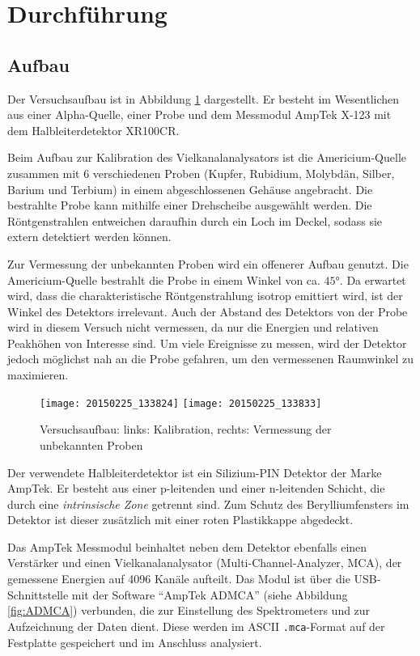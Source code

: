 \documentclass{../Misc/MontavonLaTeX/Montavon}
\newcommand{\halfwidth}{0.48\textwidth}
\begin{document}
\section{Durchführung}
\subsection{Aufbau}
Der Versuchsaufbau ist in Abbildung \ref{fig:Aufbau} dargestellt. 
Er besteht im Wesentlichen aus einer  Alpha-Quelle, einer Probe und dem Messmodul AmpTek X-123 mit dem Halbleiterdetektor XR100CR\cite{anleitung}.

Beim Aufbau zur Kalibration des Vielkanalanalysators ist die Americium-Quelle zusammen mit 6 verschiedenen Proben (Kupfer, Rubidium, Molybdän, Silber, Barium und Terbium) in einem abgeschlossenen Gehäuse angebracht. Die bestrahlte Probe kann mithilfe einer Drehscheibe ausgewählt werden. Die Röntgenstrahlen entweichen daraufhin durch ein Loch im Deckel, sodass sie extern detektiert werden können.

Zur Vermessung der unbekannten Proben wird ein offenerer Aufbau genutzt. Die Americium-Quelle bestrahlt die Probe in einem Winkel von ca. $45 \unit{\degree}$. Da erwartet wird, dass die charakteristische Röntgenstrahlung isotrop emittiert wird, ist der Winkel des Detektors irrelevant. Auch der Abstand des Detektors von der Probe wird in diesem Versuch nicht vermessen, da nur die Energien und relativen Peakhöhen von Interesse sind. Um viele Ereignisse zu messen, wird der Detektor jedoch möglichst nah an die Probe gefahren, um den vermessenen Raumwinkel zu maximieren.

\begin{figure}[htbp]
\centering
\texttt{[image: 20150225\_133824]}
\texttt{[image: 20150225\_133833]}
\caption{Versuchsaufbau: links: Kalibration, rechts: Vermessung der unbekannten Proben}
\label{fig:Aufbau}
\end{figure}

Der verwendete Halbleiterdetektor ist ein Silizium-PIN Detektor der Marke AmpTek. Er besteht aus einer p-leitenden und einer n-leitenden Schicht, die durch eine \emph{intrinsische Zone} getrennt sind\cite{anleitung}. Zum Schutz des Berylliumfensters im Detektor ist dieser zusätzlich mit einer roten Plastikkappe abgedeckt. 

Das AmpTek Messmodul beinhaltet neben dem Detektor ebenfalls einen Verstärker und einen Vielkanalanalysator (Multi-Channel-Analyzer, MCA), der gemessene Energien auf 4096 Kanäle aufteilt. Das Modul ist über die USB-Schnittstelle mit der Software \enquote{AmpTek ADMCA} (siehe Abbildung \ref{fig:ADMCA}) verbunden, die zur Einstellung des Spektrometers und zur Aufzeichnung der Daten dient. Diese werden im ASCII \texttt{.mca}-Format auf der Festplatte gespeichert und im Anschluss analysiert.
\end{document}

